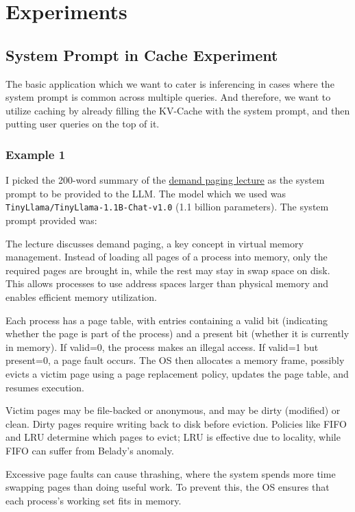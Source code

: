 \chapter{Experiments}

\section{System Prompt in Cache Experiment}

The basic application which we want to cater is inferencing in cases where the system prompt is common across multiple queries. And therefore, we want to utilize caching by already filling the KV-Cache with the system prompt, and then putting user queries on the top of it.


\subsection{Example 1}
I picked the 200-word summary of the \href{https://www.cse.iitb.ac.in/~mythili/os/iitb_slides/demand-paging.pdf}{demand paging lecture} as the system prompt to be provided to the LLM. The model which we used was \texttt{TinyLlama/TinyLlama-1.1B-Chat-v1.0} (1.1 billion parameters). The system prompt provided was:

\begin{tcolorbox}[colback=gray!10, colframe=gray!60!black, sharp corners, boxrule=0.5pt, left=4pt, right=4pt, top=4pt, bottom=4pt]
\small
The lecture discusses demand paging, a key concept in virtual memory management. Instead of loading all pages of a process into memory, only the required pages are brought in, while the rest may stay in swap space on disk. This allows processes to use address spaces larger than physical memory and enables efficient memory utilization.

Each process has a page table, with entries containing a valid bit (indicating whether the page is part of the process) and a present bit (whether it is currently in memory). If valid=0, the process makes an illegal access. If valid=1 but present=0, a page fault occurs. The OS then allocates a memory frame, possibly evicts a victim page using a page replacement policy, updates the page table, and resumes execution.

Victim pages may be file-backed or anonymous, and may be dirty (modified) or clean. Dirty pages require writing back to disk before eviction. Policies like FIFO and LRU determine which pages to evict; LRU is effective due to locality, while FIFO can suffer from Belady’s anomaly.

Excessive page faults can cause thrashing, where the system spends more time swapping pages than doing useful work. To prevent this, the OS ensures that each process’s working set fits in memory.
\end{tcolorbox}


